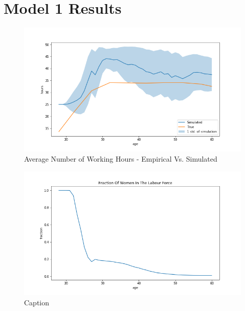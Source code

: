 \section{Model 1 Results}

\begin{figure}
    \centering
    \includegraphics[scale=0.6]{figures/dqi_model1_estimation_labour_supply.png}
    \caption{Average Number of Working Hours - Empirical Vs. Simulated}
    \label{fig:dqi_model1_average_path_sim_vs_empirical}
\end{figure}

\begin{figure}
    \centering
    \includegraphics[scale=0.6]{figures/dqi_model1_women_in_labour_force_fraction.png}
    \caption{Caption}
    \label{fig:dqi_model1_fraction_in_workforce}
\end{figure}

